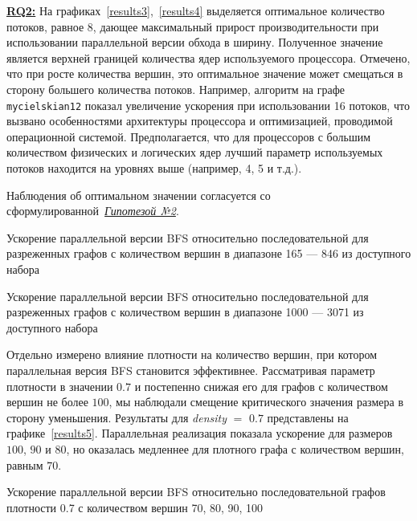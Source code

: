 \noindent\hyperref[rq2]{\textbf{RQ2:}}
На графиках~\ref{results3},~\ref{results4} выделяется оптимальное количество потоков, равное 8, дающее максимальный прирост производительности при использовании параллельной версии обхода в ширину. Полученное значение является верхней границей количества ядер используемого процессора. Отмечено, что при росте количества вершин, это оптимальное значение может смещаться в сторону большего количества потоков. Например, алгоритм на графе \texttt{mycielskian12} показал увеличение ускорения при использовании 16 потоков, что вызвано особенностями архитектуры процессора и оптимизацией, проводимой операционной системой. Предполагается, что для процессоров с большим количеством физических и логических ядер лучший параметр используемых потоков находится на уровнях выше (например, 4, 5 и т.д.). 

Наблюдения об оптимальном значении согласуется со сформулированной~\hyperref[t2]{\textit{Гипотезой №2}}.
\newline

\begin{table}
  \centering

\caption{Ускорение параллельной версии BFS относительно последовательной для разреженных графов с количеством вершин в диапазоне 165 --- 846 из доступного набора}
\label{results3}
\end{table}

\begin{table}
  \centering

\caption{Ускорение параллельной версии BFS относительно последовательной для разреженных графов с количеством вершин в диапазоне 1000 --- 3071 из доступного набора}
\label{results4}
\end{table}

Отдельно измерено влияние плотности на количество вершин, при котором параллельная версия BFS становится эффективнее. Рассматривая параметр плотности в значении $0.7$ и постепенно снижая его для графов с количеством вершин не более $100$, мы наблюдали смещение критического значения размера в сторону уменьшения. Результаты для \textit{density} $=$ $0.7$ представлены на графике~\ref{results5}. Параллельная реализация показала ускорение для размеров $100$, $90$ и $80$, но оказалась медленнее для плотного графа с количеством вершин, равным $70$.

\begin{table}
  \centering

\caption{Ускорение параллельной версии BFS относительно последовательной графов плотности 0.7 с количеством вершин 70, 80, 90, 100}
\label{results5}
\end{table}

